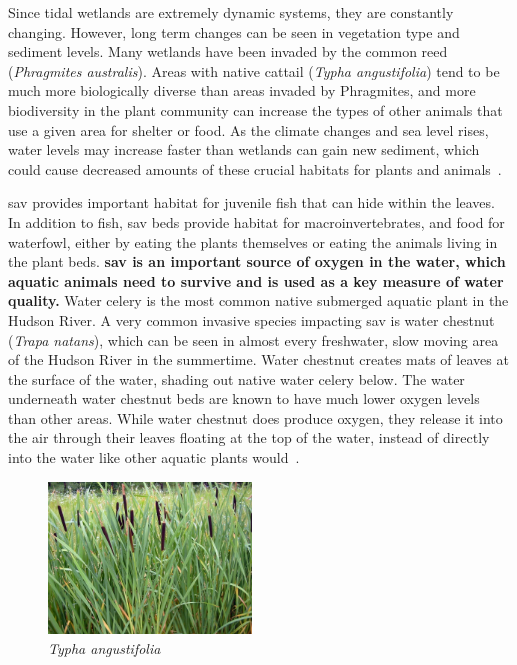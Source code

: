 Since tidal wetlands are extremely dynamic systems, they are constantly
changing. However, long term changes can be seen in vegetation type and
sediment levels. Many wetlands have been invaded by the common reed
(\textit{Phragmites australis}). Areas with native cattail (\textit{Typha
angustifolia}) tend to be much more biologically diverse than areas invaded by
Phragmites, and more biodiversity in the plant community can increase the types
of other animals that use a given area for shelter or food. As the climate
changes and sea level rises, water levels may increase faster than wetlands can
gain new sediment, which could cause decreased amounts of these crucial
habitats for plants and animals~\citep{nysdectidal}. 
\par
\gls{sav} provides important habitat for juvenile fish that can hide within the
leaves. In addition to fish, \gls{sav} beds provide habitat for
macroinvertebrates, and food for waterfowl, either by eating the plants
themselves or eating the animals living in the plant beds. \textbf{\gls{sav} is
an important source of oxygen in the water, which aquatic animals need to
survive and is used as a key measure of water quality.} Water celery is the
most common native submerged aquatic plant in the Hudson River. A very common
invasive species impacting \gls{sav} is water chestnut (\textit{Trapa natans}),
which can be seen in almost every freshwater, slow moving area of the Hudson
River in the summertime. Water chestnut creates mats of leaves at the surface
of the water, shading out native water celery below. The water underneath water
chestnut beds are known to have much lower oxygen levels than other areas.
While water chestnut does produce oxygen, they release it into the air through
their leaves floating at the top of the water, instead of directly into the
water like other aquatic plants would~\citep{nysdecsav}.

\vspace{3mm}
\begin{figure}
    \includegraphics[width=0.48\textwidth]{images/Cattail.jpg}
  \caption{\textit{Typha angustifolia}}
\end{figure}

